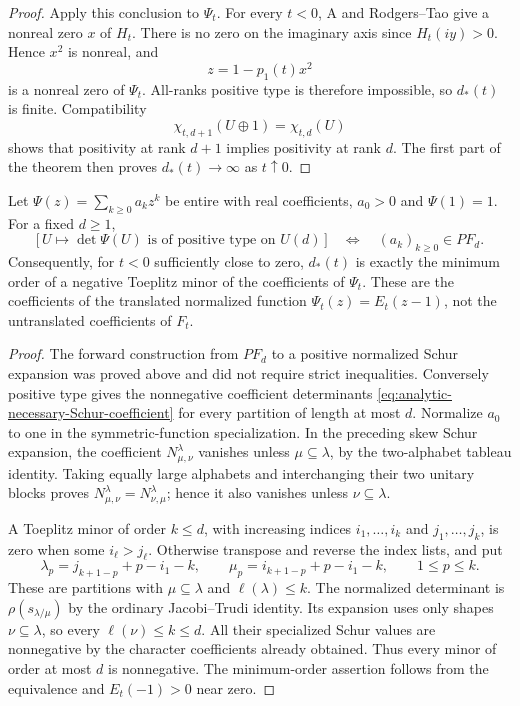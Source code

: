 \begin{proof}
Apply this conclusion to $\Psi_t$. For every $t<0$, A and
Rodgers--Tao give a nonreal zero $x$ of $H_t$. There is no
zero on the imaginary axis since $H_t(iy)>0$. Hence
$x^2$ is nonreal, and
\[
                        z=1-p_1(t)x^2
\]
is a nonreal zero of $\Psi_t$. All-ranks positive type is
therefore impossible, so $d_*(t)$ is finite. Compatibility
\[
        \chi_{t,d+1}(U\oplus1)=\chi_{t,d}(U)
\]
shows that positivity at rank $d+1$ implies positivity at
rank $d$. The first part of the theorem then proves
$d_*(t)\to\infty$ as $t\uparrow0$.
\end{proof}

\begin{corollary}
Let $\Psi(z)=\sum_{k\ge0}a_kz^k$ be entire with real coefficients,
$a_0>0$ and $\Psi(1)=1$. For a fixed $d\ge1$,
\[
 \bigl[\,U\longmapsto\det\Psi(U)
                 \text{ is of positive type on }U(d)\,\bigr]
 \quad\Longleftrightarrow\quad
                  (a_k)_{k\ge0}\in PF_d.
\]
Consequently, for $t<0$ sufficiently close to zero, $d_*(t)$ is
exactly the minimum order of a negative Toeplitz minor of the
coefficients of $\Psi_t$. These are the coefficients of the
translated normalized function $\Psi_t(z)=E_t(z-1)$, not the
untranslated coefficients of $F_t$.
\end{corollary}

\begin{proof}
The forward construction from $PF_d$ to a positive normalized
Schur expansion was proved above and did not require strict
inequalities. Conversely positive type gives the nonnegative
coefficient determinants
\eqref{eq:analytic-necessary-Schur-coefficient} for every
partition of length at most $d$. Normalize $a_0$ to one in the
symmetric-function specialization. In the preceding skew Schur
expansion, the coefficient $N_{\mu,\nu}^\lambda$ vanishes unless
$\mu\subseteq\lambda$, by the two-alphabet tableau identity.
Taking equally large alphabets and interchanging their two
unitary blocks proves
$N_{\mu,\nu}^\lambda=N_{\nu,\mu}^\lambda$; hence it also
vanishes unless $\nu\subseteq\lambda$.

A Toeplitz minor of order $k\le d$, with increasing indices
$i_1,\ldots,i_k$ and $j_1,\ldots,j_k$, is zero when some
$i_\ell>j_\ell$. Otherwise transpose and reverse the index
lists, and put
\[
 \lambda_p=j_{k+1-p}+p-i_1-k,\qquad
 \mu_p=i_{k+1-p}+p-i_1-k,\qquad 1\le p\le k.
\]
These are partitions with $\mu\subseteq\lambda$ and
$\ell(\lambda)\le k$. The normalized determinant is
$\rho(s_{\lambda/\mu})$ by the ordinary Jacobi--Trudi identity.
Its expansion uses only shapes $\nu\subseteq\lambda$, so every
$\ell(\nu)\le k\le d$. All their specialized Schur values are
nonnegative by the character coefficients already obtained.
Thus every minor of order at most $d$ is nonnegative.
The minimum-order assertion follows from the equivalence and
$E_t(-1)>0$ near zero.
\end{proof}

